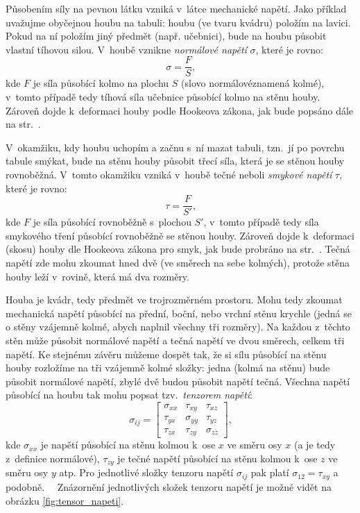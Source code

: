 \documentclass[12pt]{article}
\begin{document}
Působením síly na pevnou látku vzniká v~látce mechanické napětí. Jako příklad uvažujme obyčejnou houbu na tabuli: houbu (ve tvaru kvádru) položím na lavici. Pokud na ní položím jiný předmět (např. učebnici), bude na houbu působit vlastní tíhovou silou. V~houbě vznikne \emph{normálové napětí} $\sigma$, které je rovno: 
\begin{equation}
    \sigma = \frac{F}{S}\text{,}
\end{equation}
kde $F$ je síla působící kolmo na plochu $S$ (slovo \glqq normálové\grqq\space znamená kolmé), v~tomto případě tedy tíhová síla učebnice působící kolmo na stěnu houby. Zároveň dojde k~deformaci houby podle Hookeova zákona, jak bude popsáno dále na str.~\pageref{sec:Hookeův_zákon}.
\par
\noindent V~okamžiku, kdy houbu uchopím a začnu s~ní mazat tabuli, tzn.~jí po povrchu tabule smýkat, bude na stěnu houby působit třecí síla, která je se stěnou houby rovnoběžná. V~tomto okamžiku vzniká v~houbě tečné neboli \emph{smykové napětí} $\tau$, které je rovno: 
\begin{equation}
    \tau = \frac{F}{S'}\text{,}
    \label{eq:napeti_tau}
\end{equation}
kde $F$ je síla působící rovnoběžně s~plochou $S'$, v~tomto případě tedy síla smykového tření působící rovnoběžně se stěnou houby. Zároveň dojde k~deformaci (skosu) houby dle Hookeova zákona pro smyk, jak bude probráno na str.~\pageref{sec:Hookeův_zákon}. Tečná napětí zde mohu zkoumat hned dvě (ve směrech na sebe kolmých), protože stěna houby leží v~rovině, která má dva rozměry.
~\cite{wiki:Mechanické_napětí}
\par\noindent
Houba je kvádr, tedy předmět ve trojrozměrném prostoru. Mohu tedy zkoumat mechanická napětí působící na přední, boční, nebo vrchní stěnu krychle (jedná se o stěny vzájemně kolmé, abych naplnil všechny tři rozměry). Na každou z~těchto stěn může působit normálové napětí a tečná napětí ve dvou směrech, celkem tři napětí. Ke stejnému závěru můžeme dospět tak, že si sílu působící na stěnu houby rozložíme na tři vzájemně kolmé složky: jedna (kolmá na stěnu) bude působit normálové napětí, zbylé dvě budou působit napětí tečná. Všechna napětí působící na houbu tak mohu popsat tzv.~\emph{tenzorem napětí}:
\begin{equation}
    \sigma_{ij} = 
    \begin{bmatrix}
        \sigma_{xx} & \tau_{xy} & \tau_{xz}\\
        \tau_{yx} & \sigma_{yy} & \tau_{yz}\\
        \tau_{zx} & \tau_{zy} & \sigma_{zz}
    \end{bmatrix}
    \text{,}
\end{equation}
kde $\sigma_{xx}$ je napětí působící na stěnu kolmou k~ose $x$ ve směru osy $x$ (a je tedy z~definice normálové), $\tau_{zy}$ je tečné napětí působící na stěnu kolmou k~ose $z$ ve směru osy $y$ atp. Pro jednotlivé složky tenzoru napětí $\sigma_{ij}$ pak platí $\sigma_{12} = \tau_{xy}$ a podobně.~\cite{wiki:Stress_mechanics}~\cite{wiki:Cauchy_stress_tensor} Znázornění jednotlivých složek tenzoru napětí je možné vidět na obrázku \ref{fig:tensor_napeti}.
\end{document}
